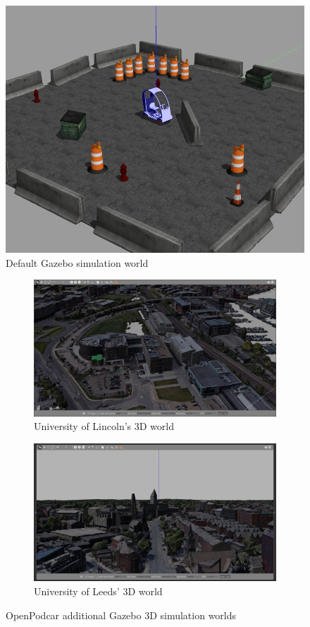 \documentclass[a4paper]{article}
\begin{document}
	
	\begin{figure}
		\centering
		\includegraphics[width=0.5\columnwidth]{figs_sim/podcar_loaded_gazebo.png}
		\caption{Default Gazebo simulation world}
		\label{fig:sim_world}
	\end{figure}
	
	\begin{figure}
		\centering
		\begin{subfigure}{0.45\textwidth}
			\centering
			\includegraphics[width=\columnwidth]{figs_sim/INBLincoln_2.png}
			\caption{University of Lincoln's 3D world}
			\label{fig:INB_world}
		\end{subfigure}	
		\quad
		\begin{subfigure}{0.45\textwidth}
			\centering
			\includegraphics[width=\columnwidth]{figs_sim/woodhouseLeeds_5.png}
			\caption{University of Leeds' 3D world}
			\label{fig:Leeds_world}
		\end{subfigure}	
		\caption{OpenPodcar additional Gazebo 3D simulation worlds}
		\label{fig:gazebo_new_worlds}
	\end{figure}
	
\end{document}
